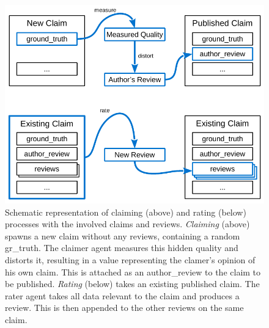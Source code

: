 \documentclass[%
    ]{\PathToTumTemplate/thesis/tum_thesis}
\begin{document}
\begin{figure}[tbp]
  \begin{center}
        \includegraphics[width=1\linewidth]	{../images/claim_rate_process-crop.pdf}
    \caption{
    Schematic representation of claiming (above) and rating (below) processes with the involved claims and reviews.
	\emph{Claiming} (above) spawns a new claim without any reviews, containing a random \gls{gr_truth}.
	The claimer agent measures this hidden quality and distorts it, resulting in a value representing the clamer's opinion of his own claim.
	This is attached as an \gls{author_review} to the claim to be published.
	\emph{Rating} (below) takes an existing published claim.
	The rater agent takes all data relevant to the claim and produces a \gls{review}.
	This is then appended to the other reviews on the same claim.
    }
    \label{fig:claim_rate_process}
  \end{center}
\end{figure}
\end{document}
